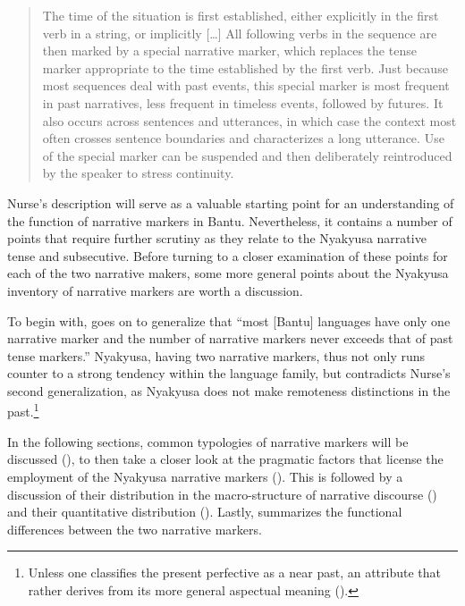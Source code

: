 \begin{quote}
The time of the situation is first established, either explicitly in the first verb in a string, or implicitly [\ldots] All following verbs in the sequence are then marked by a special narrative marker, which replaces the tense marker appropriate to the time established by the first verb. Just because most sequences deal with past events, this special marker is most frequent in past narratives, less frequent in timeless events, followed by futures. It also occurs across sentences and utterances, in which case the context most often crosses sentence boundaries and characterizes a long utterance. Use of the special marker can be suspended and then deliberately reintroduced by the speaker to stress continuity.  \citep[120]{NurseD2008}
\end{quote}

Nurse's description will serve as a valuable starting point for an understanding of the function of narrative markers in Bantu. Nevertheless, it contains a number of points that require further scrutiny as they relate to the Nyakyusa narrative tense and subsecutive. Before turning to a closer examination of these points for each of the two narrative makers, some more general points about the Nyakyusa inventory of narrative markers are worth a discussion.

To begin with, \citet[120]{NurseD2008} goes on to generalize that ``most [Bantu] languages have only one narrative marker and the number of narrative markers never exceeds that of past tense markers.'' Nyakyusa, having two narrative markers, thus not only runs counter to a strong tendency within the language family, but contradicts Nurse's second generalization, as Nyakyusa does not make remoteness distinctions in the past.\footnote{Unless one classifies the present perfective as a near past, an attribute that rather derives from its more general aspectual meaning ().}

In the following sections, common typologies of narrative markers will be discussed (), to then take a closer look at the pragmatic factors that license the employment of the Nyakyusa narrative markers (). This is followed by a discussion of their distribution in the macro-structure of narrative discourse () and their quantitative distribution (). Lastly,  summarizes the functional differences between the two narrative markers.

